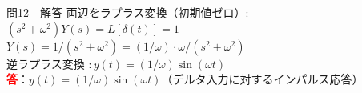 \documentclass[professionalfonts]{beamer}
\begin{document}
\begin{frame}{問12　解答}
  両辺をラプラス変換（初期値ゼロ）:\\[4pt]
  $(s^{2} + \omega^{2})Y(s) = L[\delta(t)] = 1$\\[4pt]
  $Y(s) = 1/(s^{2}+\omega^{2}) = (1/\omega)\cdot\omega/(s^{2}+\omega^{2})$\\[4pt]
  逆ラプラス変換 $: y(t) = (1/\omega)\sin(\omega t)$
  \\[8pt]\textcolor{red}{\textbf{答}}：$y(t) = (1/\omega)\sin(\omega t)$（デルタ入力に対するインパルス応答）
\end{frame}
\end{document}
